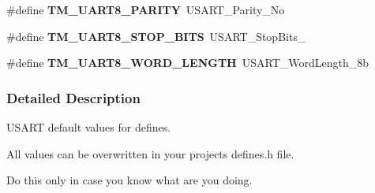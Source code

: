 \begin{DoxyCompactItemize}
\item 
\hypertarget{group___t_m___u_s_a_r_t___macros_ga499b2b7c365774aa62f865b301b46398}{}\#define {\bfseries T\+M\+\_\+\+U\+A\+R\+T8\+\_\+\+P\+A\+R\+I\+T\+Y}~U\+S\+A\+R\+T\+\_\+\+Parity\+\_\+\+No\label{group___t_m___u_s_a_r_t___macros_ga499b2b7c365774aa62f865b301b46398}

\item 
\hypertarget{group___t_m___u_s_a_r_t___macros_gabe4111019b025cd6464d258177514268}{}\#define {\bfseries T\+M\+\_\+\+U\+A\+R\+T8\+\_\+\+S\+T\+O\+P\+\_\+\+B\+I\+T\+S}~U\+S\+A\+R\+T\+\_\+\+Stop\+Bits\+\_\label{group___t_m___u_s_a_r_t___macros_gabe4111019b025cd6464d258177514268}

\item 
\hypertarget{group___t_m___u_s_a_r_t___macros_ga455c66c19d322cf45f58508d1686eb6c}{}\#define {\bfseries T\+M\+\_\+\+U\+A\+R\+T8\+\_\+\+W\+O\+R\+D\+\_\+\+L\+E\+N\+G\+T\+H}~U\+S\+A\+R\+T\+\_\+\+Word\+Length\+\_\+8b\label{group___t_m___u_s_a_r_t___macros_ga455c66c19d322cf45f58508d1686eb6c}

\end{DoxyCompactItemize}


\subsubsection{Detailed Description}
U\+S\+A\+R\+T default values for defines. 

All values can be overwritten in your project\textquotesingle{}s defines.\+h file.

Do this only in case you know what are you doing. 